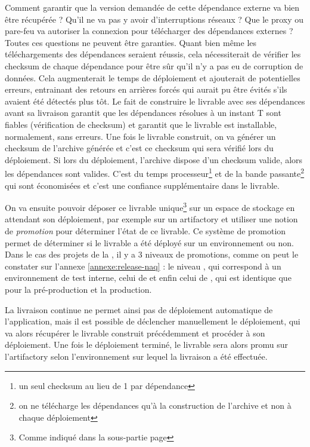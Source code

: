 Comment garantir que la version demandée de cette dépendance externe va bien être récupérée ? Qu'il ne va pas y avoir d'interruptions réseaux ? Que le proxy ou pare-feu va autoriser la connexion pour télécharger des dépendances externes ? Toutes ces questions ne peuvent être garanties. Quant bien même les téléchargements des dépendances seraient réussis, cela nécessiterait de vérifier les \gls{checksum} de chaque dépendance pour être sûr qu'il n'y a pas eu de corruption de données. Cela augmenterait le temps de déploiement et ajouterait de potentielles erreurs, entrainant des retours en arrières forcés qui aurait pu être évités s'ils avaient été détectés plus tôt. Le fait de construire le livrable avec ses dépendances avant sa livraison garantit que les dépendances résolues à un instant T sont fiables (vérification de \gls{checksum}) et garantit que le livrable est installable, normalement, sans erreurs. Une fois le livrable construit, on va générer un \gls{checksum} de l'archive générée et c'est ce \gls{checksum} qui sera vérifié lors du déploiement. Si lors du déploiement, l'archive dispose d'un \gls{checksum} valide, alors les dépendances sont valides. C'est du temps processeur\footnote{un seul \gls{checksum} au lieu de 1 par dépendance} et de la bande passante\footnote{on ne télécharge les dépendances qu'à la construction de l'archive et non à chaque déploiement} qui sont économisées et c'est une confiance supplémentaire dans le livrable.

On va ensuite pouvoir déposer ce livrable unique\footnote{Comme indiqué dans la sous-partie  page \pageref{gestion-de-version}} sur un espace de stockage en attendant son déploiement, par exemple sur un \gls{artifactory} et utiliser une notion de \textit{promotion} pour déterminer l'état de ce livrable. Ce système de promotion permet de déterminer si le livrable a été déployé sur un environnement ou non. Dans le cas des projets de la \naq, il y a 3 niveaux de promotions, comme on peut le constater sur l'annexe \ref{annexe:release-naq} : le niveau , qui correspond à un environnement de test interne, celui de  et enfin celui de , qui est identique que pour la pré-production et la production.

La livraison continue ne permet ainsi pas de déploiement automatique de l'application, mais il est possible de déclencher manuellement le déploiement, qui va alors récupérer le livrable construit précédemment et procéder à son déploiement. Une fois le déploiement terminé, le livrable sera alors promu sur l'\gls{artifactory} selon l'environnement sur lequel la livraison a été effectuée.

